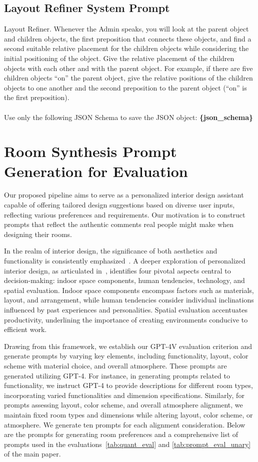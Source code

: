\subsection{Layout Refiner System Prompt}
Layout Refiner. Whenever the Admin speaks, you will look at the parent object and children objects, the first preposition that connects these objects, and find a second suitable relative placement for the children objects while considering the initial positioning of the object. 
Give the relative placement of the children objects with each other and with the parent object. For example, if there are five children objects ``on'' the parent object, give the relative positions of the children objects to one another and the second preposition to the parent object (``on'' is the first preposition).
\\\\
Use only the following JSON Schema to save the JSON object:
\textbf{\{json\_schema\}}

\section{Room Synthesis Prompt Generation for Evaluation}
Our proposed pipeline aims to serve as a personalized interior design assistant capable of offering tailored design suggestions based on diverse user inputs, reflecting various preferences and requirements. Our motivation is to construct prompts that reflect the authentic comments real people might make when designing their rooms. 

In the realm of interior design, the significance of both aesthetics and functionality is consistently emphasized~\cite{ching2018interior}. A deeper exploration of personalized interior design, as articulated in~\cite{lee2022conceptual}, identifies four pivotal aspects central to decision-making: indoor space components, human tendencies, technology, and spatial evaluation. Indoor space components encompass factors such as materials, layout, and arrangement, while human tendencies consider individual inclinations influenced by past experiences and personalities. Spatial evaluation accentuates productivity, underlining the importance of creating environments conducive to efficient work.

Drawing from this framework, we establish our GPT-4V evaluation criterion and generate prompts by varying key elements, including functionality, layout, color scheme with material choice, and overall atmosphere. These prompts are generated utilizing GPT-4. For instance, in generating prompts related to functionality, we instruct GPT-4 to provide descriptions for different room types, incorporating varied functionalities and dimension specifications. Similarly, for prompts assessing layout, color scheme, and overall atmosphere alignment, we maintain fixed room types and dimensions while altering layout, color scheme, or atmosphere. We generate ten prompts for each alignment consideration. Below are the prompts for generating room preferences and a comprehensive list of prompts used in the evaluations~\cref{tab:quant_eval} and \cref{tab:prompt_eval_unary} of the main paper.

